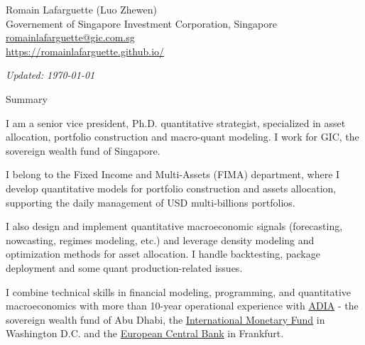 \documentclass[usegeometry, 10pt, a4paper]{cv} %
\begin{document}
\hspace{10mm}
\begin{chapeau}
\begin{adresse}
\begin{flushleft}
    Romain Lafarguette (Luo Zhewen)\\
    Governement of Singapore Investment Corporation, Singapore \\
    \href{mailto:romainlafarguette@gic.com.sg}{romainlafarguette@gic.com.sg}\\
    \url{https://romainlafarguette.github.io/} \\
\end{flushleft}
\end{adresse}
\begin{etatcivil}
\begin{flushleft}
  \hspace{15mm} \emph{Updated: \monthyeardate\today}\\
\end{flushleft}
\end{etatcivil}
\end{chapeau}

\begin{rubriquetableau}[0.95\textwidth]{Summary}\\
  \vspace{-0.5cm}
    
I  am a  senior vice president, Ph.D. quantitative strategist, specialized in asset allocation, portfolio construction and macro-quant modeling. I work for GIC, the sovereign  wealth fund of
Singapore.\\ \medskip

I belong to the Fixed Income and Multi-Assets (FIMA) department, where I develop quantitative models for portfolio construction and assets allocation, supporting the daily management of USD multi-billions portfolios. \\ \medskip

I also design and implement quantitative macroeconomic signals (forecasting, nowcasting, regimes modeling, etc.) and leverage density modeling and optimization methods for asset allocation. I handle backtesting, package deployment and some quant production-related issues. \\ \medskip

I combine technical skills in financial modeling, programming, and quantitative macroeconomics with more than 10-year operational experience with \href{https://www.adia.ae/}{ADIA} - the sovereign wealth fund of Abu Dhabi, the \href{https://www.imf.org/en/Home}{International Monetary Fund} in Washington D.C. and the \href{https://www.ecb.europa.eu/home/html/index.en.html}{European Central Bank} in Frankfurt.\\ \medskip

\end{rubriquetableau}
\end{document}
